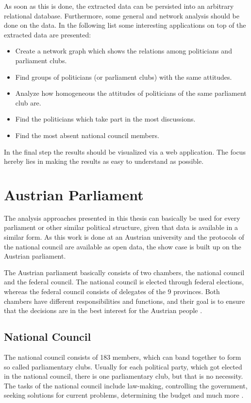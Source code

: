 As soon as this is done, the extracted data can be persisted into an arbitrary relational database. Furthermore, some general and network analysis should be done on the data. In the following list some interesting applications on top of the extracted data are presented:
\begin{itemize}
  \item Create a network graph which shows the relations among politicians and parliament clubs.
  \item Find groups of politicians (or parliament clubs) with the same attitudes.
  \item Analyze how homogeneous the attitudes of politicians of the same parliament club are.
  \item Find the politicians which take part in the most discussions.
  \item Find the most absent national council members.
\end{itemize}

In the final step the results should be visualized via a web application. The focus hereby lies in making the results as easy to understand as possible.

\section{Austrian Parliament}
The analysis approaches presented in this thesis can basically be used for every parliament or other similar political structure, given that data is available in a similar form. As this work is done at an Austrian university and the protocols of the national council are available as open data, the show case is built up on the Austrian parliament.

The Austrian parliament basically consists of two chambers, the national council and the federal council. The national council is elected through federal elections, whereas the federal council consists of delegates of the 9 provinces. Both chambers have different responsibilities and functions, and their goal is to ensure that the decisions are in the best interest for the Austrian people \cite{AustrianParliament_2015}.

\subsection{National Council}
The national council consists of 183 members, which can band together to form so called parliamentary clubs. Usually for each political party, which got elected in the national council, there is one parliamentary club, but that is no necessity. The tasks of the national council include law-making, controlling the government, seeking solutions for current problems, determining the budget and much more \cite{AustrianParliament_2015}.

